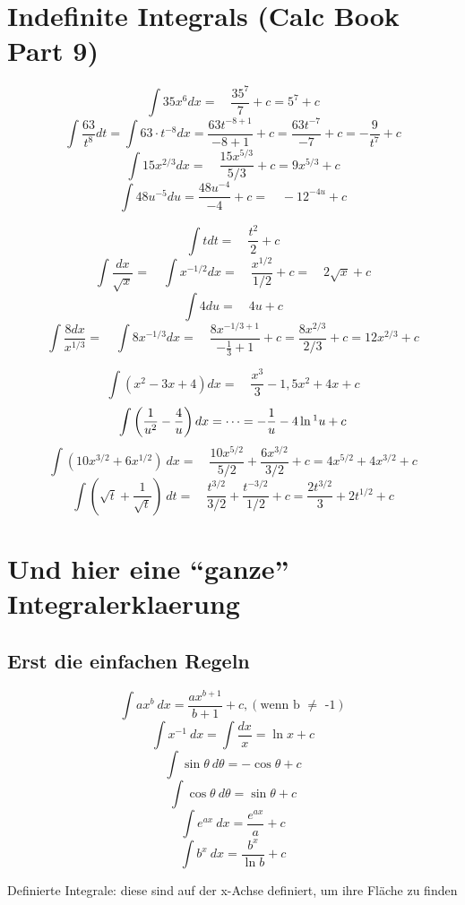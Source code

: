 \documentclass{report}
\begin{document}
\begin{multicols}{2}
\end{multicols}


\section{Indefinite Integrals (Calc Book Part 9)}

\[\int 35 x^6 dx =\quad \frac{35^7}{7}+c = 5^7+c\]
\[\int \frac{63}{t^8}dt = \int 63\cdot t^{-8} dx = \frac{63t^{-8+1}}{-8+1}+c= \frac{63t^{-7}}{-7}+c = -\frac{9}{t^7}+c\]
\[\int 15x^{2/3}dx=\quad \frac{15x^{5/3}}{5/3}+c = 9x^{5/3}+c\]
\[\int 48u^{-5}du= \frac{48u^{-4}}{-4}+c =\quad -12^{-4u}+c\]

\[\int t dt =\quad \frac{t^2}{2}+c\]
\[\int \frac{dx}{\sqrt{x}}=\quad \int x^{-1/2}dx =\quad \frac{x^{1/2}}{1/2}+c=\quad 2\sqrt{x}+c\]
\[\int 4 du =\quad 4u+c\]
\[\int \frac{8dx}{x^{1/3}} =\quad \int 8x^{-1/3}dx =\quad \frac{8x^{-1/3+1}}{-\frac{1}{3}+1}+c = \frac{8x^{2/3}}{2/3}+c = 12x^{2/3}+c \]

\[\int (x^2-3x+4)dx =\quad \frac{x^3}{3}-1,5x^2+4x+c\]
\[\int \left(\frac{1}{u^2}-\frac{4}{u}\right)dx = \dots = -\frac{1}{u}-4\ln\footnote{Recall that a power of $b=-1$ is a special case : $\int \frac{du}{u}=\int u^{-1}du=\ln u+c$} u+c \]
\[\int (10x^{3/2}+6x^{1/2})\ dx =\quad \frac{10x^{5/2}}{5/2}+\frac{6x^{3/2}}{3/2}+c = 4x^{5/2}+4x^{3/2}+c\]
\[\int \left(\sqrt{t}+\frac{1}{\sqrt{t}}\right)\ dt =\quad \frac{t^{3/2}}{3/2}+\frac{t^{-3/2}}{1/2}+c= \frac{2t^{3/2}}{3}+2t^{1/2}+c \]

\clearpage

\section{Und hier eine ``ganze'' Integralerklaerung}
\begin{multicols*}{2}
  \subsection{Erst die einfachen Regeln}
  \[\int ax^b\ dx= \frac{ax^{b+1}}{b+1}+c, (\text{wenn b $\ne$ -1})\]
  \[\int x^{-1}\ dx = \int \frac{dx}{x} = \ln x + c\]
  \[\int \sin \theta\ d\theta = -\cos \theta + c\]
  \[\int \cos \theta\ d\theta = \sin \theta + c\]
  \[\int e^{ax}\ dx= \frac{e^{ax}}{a}+c\]
  \[\int b^x\ dx = \frac{b^x}{\ln b} + c\]




Definierte Integrale: diese sind auf der x-Achse definiert, um ihre Fl\"ache zu finden
\end{multicols*}
\end{document}
